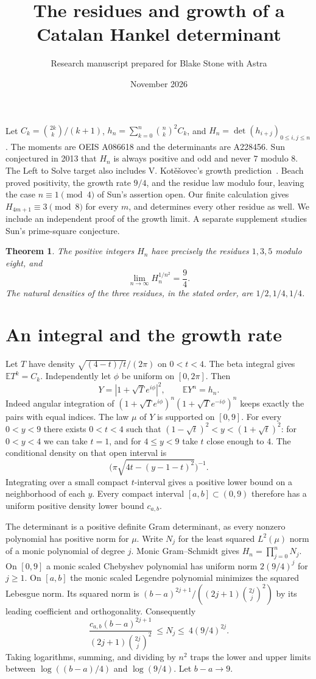 \documentclass[11pt]{article}
\title{The residues and growth of a Catalan Hankel determinant}
\author{Research manuscript prepared for Blake Stone with Astra}\date{November 2026}
\newtheorem{theorem}{Theorem}\newcommand{\CT}{\operatorname{CT}}
\begin{document}
\maketitle
Let $C_k=\binom{2k}{k}/(k+1)$, $h_n=\sum_{k=0}^n\binom nk^2 C_k$, and $H_n=\det(h_{i+j})_{0\le i,j\le n}$. The moments are OEIS A086618 and the determinants are A228456. Sun conjectured in 2013 that $H_n$ is always positive and odd and never $7$ modulo $8$. The Left to Solve target also includes V. Kot\v e\v sovec's growth prediction~\cite{board,oeis}. Beach~\cite{beach} proved positivity, the growth rate $9/4$, and the residue law modulo four, leaving the case $n\equiv1\pmod4$ of Sun's assertion open. Our finite calculation gives $H_{4m+1}\equiv3\pmod8$ for every $m$, and determines every other residue as well. We include an independent proof of the growth limit. A separate supplement studies Sun's prime-square conjecture.
\begin{theorem}
The positive integers $H_n$ have precisely the residues $1,3,5$ modulo eight, and
\[
             \lim_{n\to\infty} H_n^{1/n^2}=\frac94 .
\]
The natural densities of the three residues, in the stated order, are $1/2,1/4,1/4$.
\end{theorem}

\section{An integral and the growth rate}
Let $T$ have density $\sqrt{(4-t)/t}/(2\pi)$ on $0<t<4$. The beta integral gives $\mathbb E T^k=C_k$. Independently let $\phi$ be uniform on $[0,2\pi]$. Then
\[
Y=|1+\sqrt T e^{i\phi}|^2,\qquad \mathbb E Y^n=h_n.
\]
Indeed angular integration of $(1+\sqrt T e^{i\phi})^n(1+\sqrt T e^{-i\phi})^n$ keeps exactly the pairs with equal indices. The law $\mu$ of $Y$ is supported on $[0,9]$. For every $0<y<9$ there exists $0<t<4$ such that $(1-\sqrt t)^2<y<(1+\sqrt t)^2$: for $0<y<4$ we can take $t=1$, and for $4\le y<9$ take $t$ close enough to $4$. The conditional density on that open interval is
\[
 \big(\pi\sqrt{4t-(y-1-t)^2}\big)^{-1}.
\]
Integrating over a small compact $t$-interval gives a positive lower bound on a neighborhood of each $y$. Every compact interval $[a,b]\subset(0,9)$ therefore has a uniform positive density lower bound $c_{a,b}$.

The determinant is a positive definite Gram determinant, as every nonzero polynomial has positive norm for $\mu$. Write $N_j$ for the least squared $L^2(\mu)$ norm of a monic polynomial of degree $j$. Monic Gram--Schmidt gives $H_n=\prod_{j=0}^n N_j$. On $[0,9]$ a monic scaled Chebyshev polynomial has uniform norm $2(9/4)^j$ for $j\ge1$. On $[a,b]$ the monic scaled Legendre polynomial minimizes the squared Lebesgue norm. Its squared norm is $(b-a)^{2j+1}/((2j+1)\binom{2j}{j}^2)$ by its leading coefficient and orthogonality. Consequently
\[
 \frac{c_{a,b}(b-a)^{2j+1}}{(2j+1)\binom{2j}{j}^2}\ \le N_j\le\ 4(9/4)^{2j}.
\]
Taking logarithms, summing, and dividing by $n^2$ traps the lower and upper limits between $\log((b-a)/4)$ and $\log(9/4)$. Let $b-a\to9$.
\end{document}
